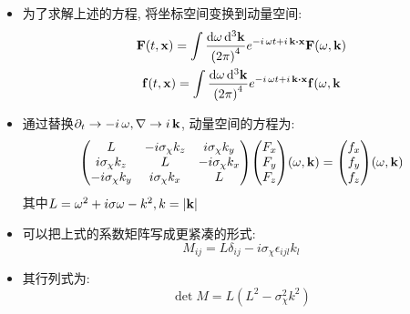 \documentclass{beamer}
\begin{document}
\begin{frame}
  \begin{itemize}
  \item 为了求解上述的方程, 将坐标空间变换到动量空间:
    \begin{gather}
      \vb{F}(t,\vb{x}) = \int \frac{\dd{\omega}\dd[3]{\vb{k}}}{{(2\pi)}^4} e^{-i\,\omega t + i\,\vb{k}\vdot\vb{x}} \vb{F}(\omega, \vb{k}) \\
      \vb{f}(t,\vb{x}) = \int \frac{\dd{\omega}\dd[3]{\vb{k}}}{{(2\pi)}^4} e^{-i\,\omega t + i\,\vb{k}\vdot\vb{x}} \vb{f}(\omega, \vb{k}
    \end{gather}
  \item 通过替换$\partial_t \rightarrow -i\,\omega, \nabla \rightarrow i\,\vb{k}$, 动量空间的方程为:
    \begin{equation}
      \mqty(L & -i\sigma_{\chi}k_z & i\sigma_{\chi}k_y \\
      i\sigma_{\chi}k_z & L & -i\sigma_{\chi} k_x \\
      -i\sigma_{\chi}k_y & i\sigma_{\chi}k_x & L)
      \mqty(F_x \\ F_y \\ F_z) (\omega,\vb{k}) = \mqty(f_x \\ f_y \\ f_z)(\omega,\vb{k})
    \end{equation}
    其中$L = \omega^2 + i\sigma\omega - k^2, k = |\vb{k}|$
  \end{itemize}
\end{frame}

\begin{frame}
  \begin{itemize}
  \item 可以把上式的系数矩阵写成更紧凑的形式:
    \begin{equation}
      M_{ij} = L \delta_{ij} - i\sigma_{\chi} \epsilon_{ijl}k_l
    \end{equation}
  \item 其行列式为:
    \begin{equation}
      \det M = L(L^2 - \sigma_{\chi}^2 k^2)
    \end{equation}

  \end{itemize}
\end{frame}
\end{document}
